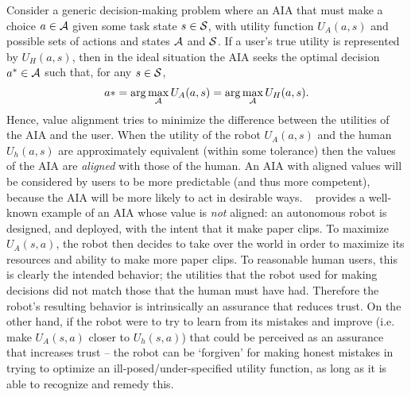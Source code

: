 Consider a generic decision-making problem where an AIA that must make a choice $a \in {\cal A}$ given some task state $s \in {\cal S}$, with utility function $U_A(a,s)$ and possible sets of actions and states ${\cal A}$ and ${\cal S}$. If a user's true utility is represented by $U_H(a,s)$, then in the ideal situation the AIA seeks the optimal decision $a^* \in {\cal A}$ such that, for any $s \in {\cal S}$,
\begin{align*}
    a* = \arg\max_{\cal A} U_A(a,s) = \arg \max_{\cal A} U_H(a,s). 
\end{align*}
Hence, value alignment tries to minimize the difference between the utilities of the AIA and the user. When the utility of the robot $U_A(a,s)$ and the human $U_h(a,s)$ are approximately equivalent (within some tolerance) then the values of the AIA are \emph{aligned} with those of the human. An AIA with aligned values will be considered by users to be more predictable (and thus more competent), because the AIA will be more likely to act in desirable ways. 
% 
~\citet{Bostrom2014-fz} provides a well-known example of an AIA whose value is \emph{not} aligned: an autonomous robot is designed, and deployed, with the intent that it make paper clips. To maximize $U_A(s,a)$, the robot then decides to take over the world in order to maximize its resources and ability to make more paper clips. To reasonable human users, this is clearly  the intended behavior; the utilities that the robot used for making decisions did not match those that the human must have had. Therefore the robot's resulting behavior is intrinsically an assurance that reduces trust. On the other hand, if the robot were to try to learn from its mistakes and improve (i.e. make $U_A(s,a)$ closer to $U_h(s,a)$) that could be perceived as an assurance that increases trust -- the robot can be `forgiven' for making honest mistakes in trying to optimize an ill-posed/under-specified utility function, as long as it is able to recognize and remedy this. 

